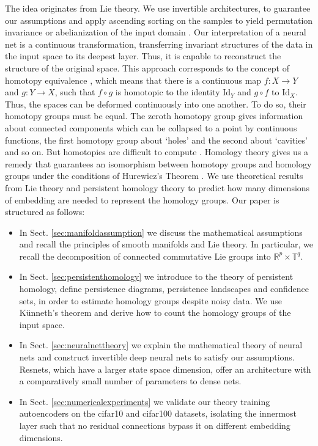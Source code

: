 \documentclass[envcountsect,runningheads]{llncs}
\begin{document}
The idea originates from Lie theory. We use invertible architectures, to guarantee our assumptions and apply ascending sorting on the samples to yield permutation invariance or abelianization of the input domain . Our interpretation of a neural net is a continuous transformation, transferring invariant structures of the data in the input space to its deepest layer. Thus, it is capable to reconstruct the structure of the original space. This approach corresponds to the concept of homotopy equivalence , which means that there is a continuous map $f: X \rightarrow Y$ and $g: Y \rightarrow X$, such that $f \circ g$ is homotopic to the identity $\text{Id}_Y$ and $g \circ f$ to $\text{Id}_X$. Thus, the spaces can be deformed continuously into one another. To do so, their homotopy groups must be equal. The zeroth homotopy group gives information about connected components which can be collapsed to a point by continuous functions, the first homotopy group about `holes' and the second about `cavities' and so on. But homotopies are difficult to compute . Homology theory gives us a remedy that guarantees an isomorphism between homotopy groups and homology groups under the conditions of Hurewicz's Theorem . We use theoretical results from Lie theory and persistent homology theory to predict how many dimensions of embedding are needed to represent the homology groups. Our paper is structured as follows:
\begin{itemize}
    \item In Sect. \ref{sec:manifoldassumption} we discuss the mathematical assumptions and recall the principles of smooth manifolds and Lie theory. In particular, we recall the decomposition of connected commutative Lie groups into $\mathbb{R}^p \times \mathbb{T}^q$.
    \item In Sect. \ref{sec:persistenthomology} we introduce to the theory of persistent homology, define persistence diagrams, persistence landscapes and confidence sets, in order to estimate homology groups despite noisy data. We use Künneth's theorem and derive how to count the homology groups of the input space.
    \item In Sect. \ref{sec:neuralnettheory} we explain the mathematical theory of neural nets and construct invertible deep neural nets to satisfy our assumptions. Resnets, which have a larger state space dimension, offer an architecture with a comparatively small number of parameters to dense nets.
    \item In Sect. \ref{sec:numericalexperiments} we validate our theory training autoencoders on the cifar10 and cifar100 datasets, isolating the innermost layer such that no residual connections bypass it on different embedding dimensions.
\end{itemize}
\end{document}
